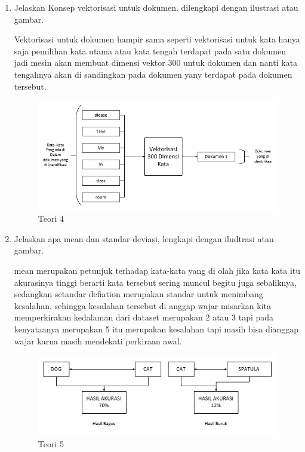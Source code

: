 \begin{enumerate}
\item Jelaskan Konsep vektorisasi untuk dokumen. dilengkapi dengan ilustrasi atau gambar. \par
Vektorisasi untuk dokumen hampir sama seperti vektorisasi untuk kata hanya saja pemilihan kata utama atau kata tengah terdapat pada satu dokumen jadi mesin akan membuat dimensi vektor 300 untuk dokumen dan nanti kata tengahnya akan di sandingkan pada dokumen yany terdapat pada dokumen tersebut.

\begin{figure}[ht]
\centering
\includegraphics[scale=0.6]{figures/1174075/5/1,4.PNG}
\caption{Teori 4}
\label{contoh}
\end{figure}

\item Jelaskan apa mean dan standar deviasi, lengkapi dengan iludtrasi atau gambar. \par
mean merupakan petunjuk terhadap kata-kata yang di olah jika kata kata itu akurasinya tinggi berarti kata tersebut sering muncul begitu juga sebaliknya, sedangkan setandar defiation merupakan standar untuk menimbang kesalahan. sehingga kesalahan tersebut di anggap wajar misarkan kita memperkirakan kedalaman dari dataset merupakan 2 atau 3 tapi pada kenyataanya merupakan 5 itu merupakan kesalahan tapi masih bisa dianggap wajar karna masih mendekati perkiraan awal.

\begin{figure}[ht]
\centering
\includegraphics[scale=0.6]{figures/1174075/5/1,5.PNG}
\caption{Teori 5}
\label{contoh}
\end{figure}


\end{enumerate}
